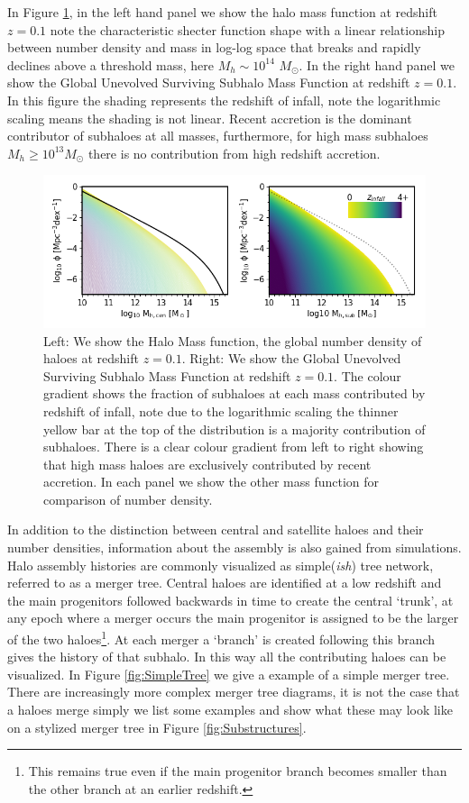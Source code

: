 In Figure \ref{fig:SubHaloes_byz}, in the left hand panel we show the halo mass function at redshift $z=0.1$ note the characteristic shecter function shape with a linear relationship between number density and mass in log-log space that breaks and rapidly declines above a threshold mass, here $M_h\sim 10^{14}$ $M_{\odot}$. In the right hand panel we show the Global Unevolved Surviving Subhalo Mass Function at redshift $z=0.1$. In this figure the shading represents the redshift of infall, note the logarithmic scaling means the shading is not linear. Recent accretion is the dominant contributor of subhaloes at all masses, furthermore, for high mass subhaloes $M_h \geq 10^{13} M_{\odot}$ there is no contribution from high redshift accretion.

\begin{figure}[h]
	\centering
	\includegraphics[width = \linewidth]{Figures/Chapter1/SubHaloes_byz.png}
    \caption{Left: We show the Halo Mass function, the global number density of haloes at redshift $z=0.1$. Right: We show the Global Unevolved Surviving Subhalo Mass Function at redshift $z=0.1$. The colour gradient shows the fraction of subhaloes at each mass contributed by redshift of infall, note due to the logarithmic scaling the thinner yellow bar at the top of the distribution is a majority contribution of subhaloes. There is a clear colour gradient from left to right showing that high mass haloes are exclusively contributed by recent accretion. In each panel we show the other mass function for comparison of number density.}
	\label{fig:SubHaloes_byz}
\end{figure}

In addition to the distinction between central and satellite haloes and their number densities, information about the assembly is also gained from simulations. Halo assembly histories are commonly visualized as simple(\textit{ish}) tree network, referred to as a merger tree. Central haloes are identified at a low redshift and the main progenitors followed backwards in time to create the central `trunk', at any epoch where a merger occurs the main progenitor is assigned to be the larger of the two haloes\footnote{This remains true even if the main progenitor branch becomes smaller than the other branch at an earlier redshift.}. At each merger a `branch' is created following this branch gives the history of that subhalo. In this way all the contributing haloes can be visualized. In Figure \ref{fig:SimpleTree} we give a example of a simple merger tree. There are increasingly more complex merger tree diagrams, it is not the case that a haloes merge simply we list some examples and show what these may look like on a stylized merger tree in Figure \ref{fig:Substructures}.

